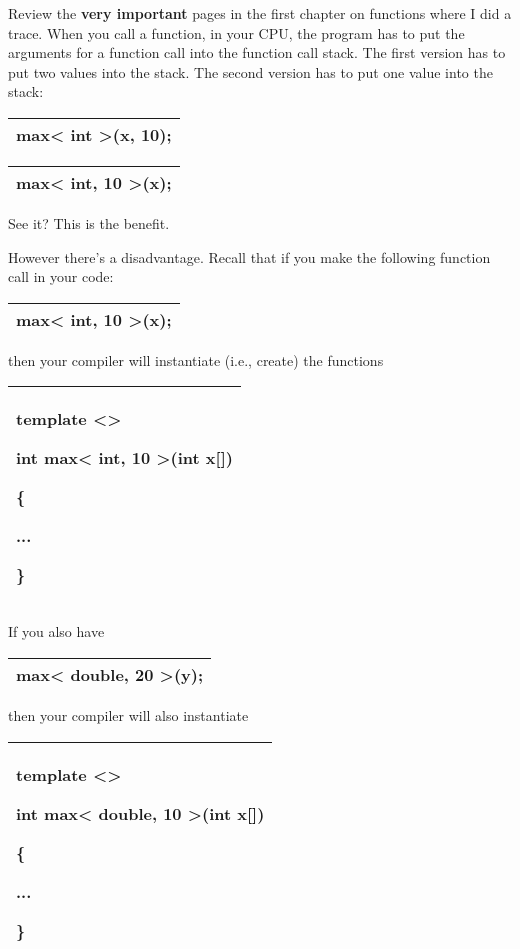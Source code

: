 \documentclass[
]{article}
\begin{document}
Review the \textbf{very important} pages in the first chapter on
functions where I did a trace. When you call a function, in your CPU,
the program has to put the arguments for a function call into the
function call stack. The first version has to put two values into the
stack. The second version has to put one value into the stack:

\begin{longtable}[]{@{}l@{}}
\toprule
\endhead
max\textless{} int \textgreater(\textbf{x, 10}); \tabularnewline
\bottomrule
\end{longtable}

\begin{longtable}[]{@{}l@{}}
\toprule
\endhead
max\textless{} int, 10 \textgreater(\textbf{x}); \tabularnewline
\bottomrule
\end{longtable}

See it? This is the benefit.

However there's a disadvantage. Recall that if you make the following
function call in your code:

\begin{longtable}[]{@{}l@{}}
\toprule
\endhead
max\textless{} int, 10 \textgreater(x); \tabularnewline
\bottomrule
\end{longtable}

then your compiler will instantiate (i.e., create) the functions

\begin{longtable}[]{@{}l@{}}
\toprule
\endhead
\begin{minipage}[t]{0.97\columnwidth}\raggedright
template \textless\textgreater{}

int max\textless{} int, 10 \textgreater(int x{[}{]})

\{

...

\}\strut
\end{minipage}\tabularnewline
\bottomrule
\end{longtable}

If you also have

\begin{longtable}[]{@{}l@{}}
\toprule
\endhead
max\textless{} double, 20 \textgreater(y); \tabularnewline
\bottomrule
\end{longtable}

then your compiler will also instantiate

\begin{longtable}[]{@{}l@{}}
\toprule
\endhead
\begin{minipage}[t]{0.97\columnwidth}\raggedright
template \textless\textgreater{}

int max\textless{} double, 10 \textgreater(int x{[}{]})

\{

...

\}\strut
\end{minipage}\tabularnewline
\bottomrule
\end{longtable}
\end{document}
